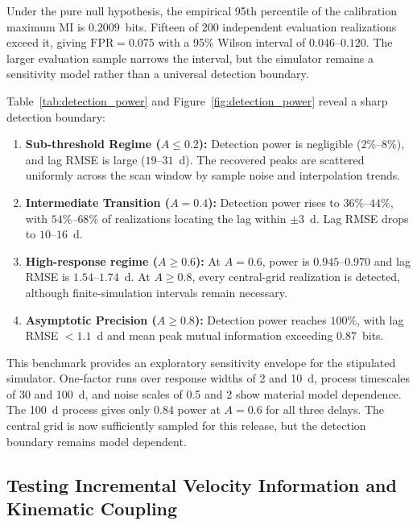 \documentclass[fleqn,usenatbib]{mnras}
\begin{document}
Under the pure null hypothesis, the empirical 95th percentile of the calibration maximum MI is $0.2009$~bits. Fifteen of 200 independent evaluation realizations exceed it, giving $\mathrm{FPR}=0.075$ with a 95\% Wilson interval of $0.046$--$0.120$. The larger evaluation sample narrows the interval, but the simulator remains a sensitivity model rather than a universal detection boundary.

Table~\ref{tab:detection_power} and Figure~\ref{fig:detection_power} reveal a sharp detection boundary:
\begin{enumerate}
    \item \textbf{Sub-threshold Regime ($A \le 0.2$):} Detection power is negligible ($2\%$--$8\%$), and lag RMSE is large ($19$--$31$~d). The recovered peaks are scattered uniformly across the scan window by sample noise and interpolation trends.
    \item \textbf{Intermediate Transition ($A = 0.4$):} Detection power rises to $36\%$--$44\%$, with $54\%$--$68\%$ of realizations locating the lag within $\pm 3$~d. Lag RMSE drops to $10$--$16$~d.
    \item \textbf{High-response regime ($A \ge 0.6$):} At $A=0.6$, power is $0.945$--$0.970$ and lag RMSE is $1.54$--$1.74$~d. At $A\ge0.8$, every central-grid realization is detected, although finite-simulation intervals remain necessary.
    \item \textbf{Asymptotic Precision ($A \ge 0.8$):} Detection power reaches $100\%$, with lag RMSE $< 1.1$~d and mean peak mutual information exceeding $0.87$~bits.
\end{enumerate}
This benchmark provides an exploratory sensitivity envelope for the stipulated simulator. One-factor runs over response widths of 2 and 10~d, process timescales of 30 and 100~d, and noise scales of 0.5 and 2 show material model dependence. The 100~d process gives only $0.84$ power at $A=0.6$ for all three delays. The central grid is now sufficiently sampled for this release, but the detection boundary remains model dependent.

\subsection{Testing Incremental Velocity Information and Kinematic Coupling}
\label{sec:incremental_information}
\end{document}
